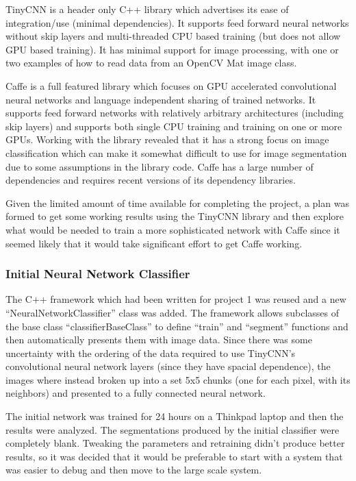 \documentclass[12pt]{article}
\begin{document}
TinyCNN is a header only C++ library which advertises its ease of integration/use (minimal dependencies).  It supports feed forward neural networks without skip layers and  multi-threaded CPU based training (but does not allow GPU based training).  It has minimal support for image processing, with one or two examples of how to read data from an OpenCV Mat image class.  

Caffe is a full featured library which focuses on GPU accelerated convolutional neural networks and language independent sharing of trained networks.  It supports feed forward networks with relatively arbitrary architectures (including skip layers) and supports both single CPU training and training on one or more GPUs.  Working with the library revealed that it has a strong focus on image classification which can make it somewhat difficult to use for image segmentation due to some assumptions in the library code.  Caffe has a large number of dependencies and requires recent versions of its dependency libraries.

	Given the limited amount of time available for completing the project, a plan was formed to get some working results using the TinyCNN library and then explore what would be needed to train a more sophisticated network with Caffe since it seemed likely that it would take significant effort to get Caffe working.

\subsubsection{Initial Neural Network Classifier}
	The C++ framework which had been written for project 1 was reused and a new “NeuralNetworkClassifier” class was added.  The framework allows subclasses of the base class “classifierBaseClass” to define “train” and “segment” functions and then automatically presents them with image data.  Since there was some uncertainty with the ordering of the data required to use TinyCNN's convolutional neural network layers (since they have spacial dependence), the images where instead broken up into a set 5x5 chunks (one for each pixel, with its neighbors) and presented to a fully connected neural network.

	The initial network was trained for 24 hours on a Thinkpad laptop and then the results were analyzed.  The segmentations produced by the initial classifier were completely blank.  Tweaking the parameters and retraining didn't produce better results, so it was decided that it would be preferable to start with a system that was easier to debug and then move to the large scale system.
\end{document}
